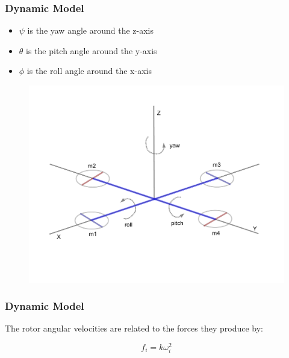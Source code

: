 \documentclass{beamer}
\begin{document}
\begin{frame}
\frametitle{Dynamic Model}


\begin{itemize}
	\item $\psi$ is the yaw angle around the z-axis
	\item $\theta$ is the pitch angle around the y-axis
	\item $\phi$ is the roll angle around the x-axis
\end{itemize}

\begin{figure}
\includegraphics[width=0.8\linewidth]{coords.pdf}
\end{figure}

\end{frame}



\begin{frame}
\frametitle{Dynamic Model}

The rotor angular velocities are related to the forces they produce by:

\begin{equation}
	f_i = k \omega^2_i
\end{equation}


\end{frame}


\end{document}
